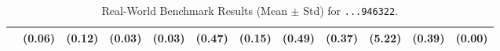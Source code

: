 \begin{table}[ht]
{\begin{tabular}{l cccc cccc cc c}
                                    & (0.06)                                          & (0.12)                                       & (0.03)                                        & (0.03)                  & (0.47)           & (0.15)          & (0.49)            & (0.37)          & (5.22)          & (0.39)          & (0.00)            \\
            \bottomrule
        \end{tabular}%
    }
    \caption{Real-World Benchmark Results (Mean $\pm$ Std) for \texttt{...946322}.}
    \label{tab:real_world_results1}

\end{table}